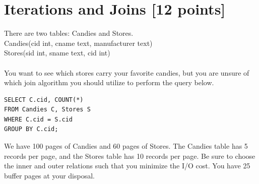 \documentclass[10pt]{article}
\begin{document}
\newpage
\section{Iterations and Joins \textbf{[12 points]}}
There are two tables: Candies and Stores. \\

Candies(cid int, cname text, manufacturer text) \\

Stores(sid int, sname text, cid int) \\
\\
You want to see which stores carry your favorite candies, but you are unsure of which join
algorithm you should utilize to perform the query below. 
\begin{verbatim}
SELECT C.cid, COUNT(*)
FROM Candies C, Stores S
WHERE C.cid = S.cid
GROUP BY C.cid;
\end{verbatim}

\noindent
We have 100 pages of Candies and 60 pages of Stores. The Candies table has 5 records per
page, and the Stores table has 10 records per page. Be sure to choose the inner and outer relations such that you minimize the I/O cost. You have 25 buffer pages at your disposal.
\end{document}
